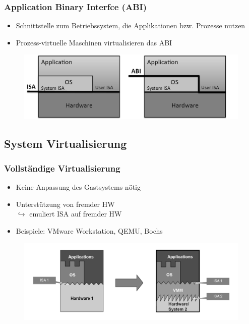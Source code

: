 \documentclass[a4paper,10pt]{scrreprt}
\begin{document}
	\subsubsection{Application Binary Interfce (ABI)}
	\begin{itemize}
		\item Schnittstelle zum Betriebssystem, die Applikationen bzw. Prozesse nutzen
		\item Prozess-virtuelle Maschinen virtualisieren das ABI
	\end{itemize}
	\begin{figure}[ht]
		\centering
		\includegraphics[width=.8\textwidth]{images/isa_abi}
	\end{figure}
	\subsection{System Virtualisierung}
	\subsubsection{Vollständige Virtualisierung}
	\begin{itemize}
		\item Keine Anpassung des Gastsystems nötig
		\item Unterstützung von fremder HW\\[5pt]
		$\hookrightarrow$ emuliert ISA auf fremder HW
		\item Beispiele: VMware Workstation, QEMU, Bochs
	\end{itemize}
	\begin{figure}[ht]
		\centering
		\includegraphics[width=1\textwidth]{images/vollstaendige}
	\end{figure}
\end{document}
